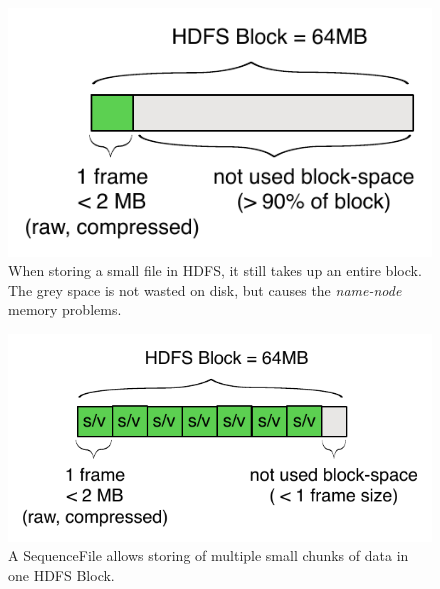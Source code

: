 \begin{figure}[ch!]
  \centering
  \includegraphics[scale=0.9]{diagrams/no-sequence-file.pdf}
  \caption{When storing a small file in HDFS, it still takes up an entire block. The grey space is not wasted on disk, but causes the \textit{name-node} memory problems.}
  \label{no-sequence-file}
\end{figure}

\begin{figure}[ch!]
  \centering
  \includegraphics[scale=0.9]{diagrams/sequence-file.pdf}
  \caption{A SequenceFile allows storing of multiple small chunks of data in one HDFS Block.}
  \label{sequence-file}
\end{figure}
